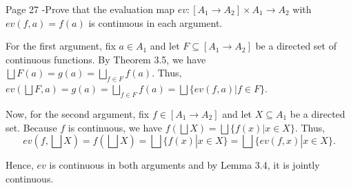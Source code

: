 \begin{problem}{Page 27}
    -Prove that the evaluation map $ev:[A_1 \to A_2] \times A_1 \to A_2$ with $ev(f,a) = f(a)$ is continuous in each argument.
\end{problem}

\begin{solution}
    For the first argument, fix $a \in A_1$ and let $F \subseteq [A_1 \to A_2]$ be a directed set of continuous functions. 
By Theorem 3.5, we have $\bigsqcup F(a) = g(a) = \bigsqcup_{f \in F} f(a)$. Thus,
$ev(\bigsqcup F, a) = g(a) = \bigsqcup_{f \in F} f(a) = \bigsqcup \{ ev(f,a) | f \in F\} $.


Now, for the second argument, fix $f \in [A_1 \to A_2]$ and let $X \subseteq A_1$ be a directed set.
Because $f$ is continuous, we have $f(\bigsqcup X) = \bigsqcup \{f(x) | x \in X\}$. Thus,
$$ ev(f, \bigsqcup X) = f(\bigsqcup X) = \bigsqcup \{f(x) | x \in X\} = \bigsqcup \{ ev(f,x) | x \in X \}. $$

Hence, $ev$ is continuous in both arguments and by Lemma 3.4, it is jointly continuous.
\end{solution}